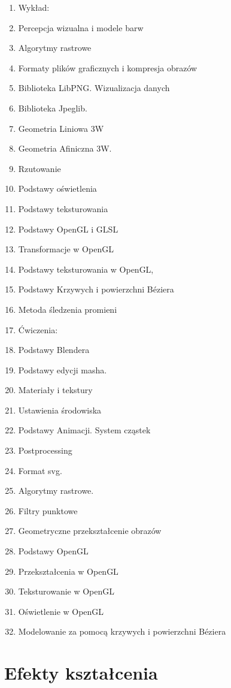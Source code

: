 \documentclass[12pt, a4paper]{article}
\begin{document}
\begin{enumerate}
  \item Wykład:
  \item Percepcja wizualna i modele barw
  \item Algorytmy rastrowe
  \item Formaty plików graficznych i kompresja obrazów
  \item Biblioteka LibPNG. Wizualizacja danych
  \item Biblioteka Jpeglib.
  \item Geometria Liniowa 3W
  \item Geometria Afiniczna 3W.
  \item Rzutowanie
  \item Podstawy oświetlenia
  \item Podstawy teksturowania
  \item Podstawy OpenGL i GLSL
  \item Transformacje w OpenGL
  \item Podstawy teksturowania w OpenGL,
  \item Podstawy Krzywych i powierzchni Béziera
  \item Metoda śledzenia promieni
  \item Ćwiczenia:
  \item Podstawy Blendera
  \item Podstawy edycji masha.
  \item Materiały i tekstury
  \item Ustawienia środowiska
  \item Podstawy Animacji. System cząstek
  \item Postprocessing
  \item Format svg.
  \item Algorytmy rastrowe.
  \item Filtry punktowe
  \item Geometryczne przekształcenie obrazów
  \item Podstawy OpenGL
  \item Przekształcenia w OpenGL
  \item Teksturowanie w OpenGL
  \item Oświetlenie w OpenGL
  \item Modelowanie za pomocą krzywych i powierzchni Béziera
\end{enumerate}

\section{Efekty kształcenia}
\end{document}

